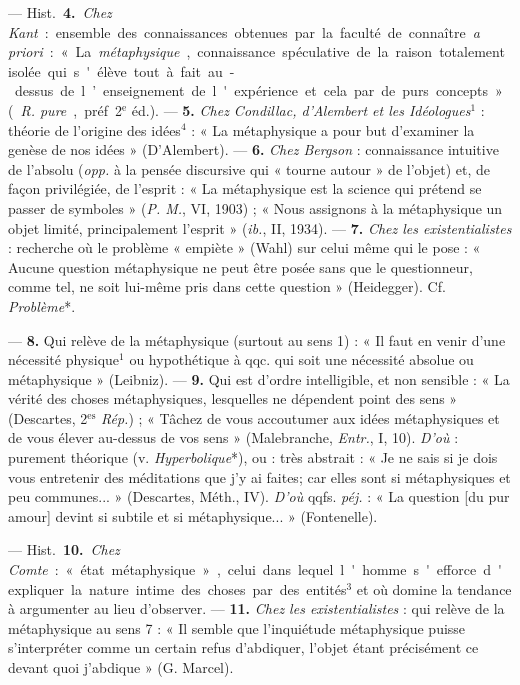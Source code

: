 \begin{itemize}[leftmargin=1cm, label=, itemsep=1pt]
— \si{Hist.} {\bf 4.} {\it Chez Kant} : ensemble des connaissances obtenues
par la faculté de connaître {\it a priori} : « La {\it métaphysique},
connaissance spéculative de la raison totalement isolée qui s'élève tout à
fait au-dessus de l’enseignement de l'expérience et cela par de purs
concepts... » ({\it R. pure}, préf. 2$^\text{e}$ éd.). — {\bf 5.} {\it Chez
Condillac, d’Alembert et les Idéologues}$^1$ : théorie de l’origine des
idées$^4$ : « La métaphysique a pour but d'examiner la genèse de nos
idées » (D’Alembert). — {\bf 6.} {\it Chez Bergson} : connaissance intuitive
de l'absolu ({\it opp.} à la pensée discursive qui « tourne autour » de
l’objet) et, de façon privilégiée, de l'esprit : « La métaphysique est la
science qui prétend se passer de symboles » ({\it P. M.}, VI, 1903) ; « Nous
assignons à la métaphysique un objet limité, principalement l'esprit »
({\it ib.}, II, 1934). — {\bf 7.} {\it Chez les existentialistes} : recherche
où le problème « empiète » (Wahl) sur celui même qui le pose : « Aucune
question métaphysique ne peut être posée sans que le questionneur, comme tel,
ne soit lui-même pris dans cette question » (Heidegger). Cf. {\it Problème}*.

 — {\bf 8.} Qui relève de la métaphysique (surtout au
sens 1) : « Il faut en venir d’une nécessité physique$^1$ ou hypothétique à
qqc. qui soit une nécessité absolue ou métaphysique » (Leibniz). — {\bf 9.}
Qui est d’ordre intelligible, et non
sensible : « La vérité des choses métaphysiques, lesquelles ne dépendent
point des sens » (Descartes, 2$^\text{es}$ {\it Rép.}) ; « Tâchez de vous
accoutumer aux idées métaphysiques et de vous élever au-dessus de vos
sens » (Malebranche, {\it Entr.}, I, 10). {\it D'où} : purement théorique
(v. {\it Hyperbolique}*), ou : très abstrait : « Je ne sais si je dois vous
entretenir des méditations que j'y ai faites; car elles sont si métaphysiques
et peu communes... » (Descartes, Méth., IV). {\it D'où} qqfs. {\it péj.} :
« La question [du pur amour] devint si subtile et si
métaphysique... » (Fontenelle).

— \si{Hist.} {\bf 10.} {\it Chez Comte} : « état métaphysique », celui dans
lequel l'homme s'efforce d'expliquer la nature intime des choses par des
entités$^3$ et où domine la tendance à argumenter au lieu d'observer. —
{\bf 11.} {\it Chez les existentialistes} : qui relève de la métaphysique au
sens 7 : « Il semble que l'inquiétude métaphysique puisse s’interpréter comme
un certain refus d’abdiquer, l’objet étant précisément ce devant quoi
j'abdique » (G. Marcel).


\end{itemize}

